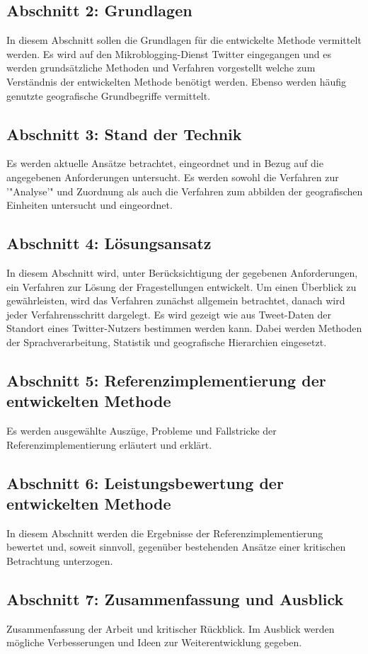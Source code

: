 		\subsection*{Abschnitt 2: Grundlagen}
			In diesem Abschnitt sollen die Grundlagen für die entwickelte Methode vermittelt werden. 
			Es wird auf den Mikroblogging-Dienst Twitter eingegangen und es werden grundsätzliche Methoden und Verfahren vorgestellt welche zum Verständnis der entwickelten Methode benötigt werden. 
			Ebenso werden häufig genutzte geografische Grundbegriffe vermittelt.

		\subsection*{Abschnitt 3: Stand der Technik}
			Es werden aktuelle Ansätze betrachtet, eingeordnet und in Bezug auf die angegebenen Anforderungen untersucht.
			Es werden sowohl die Verfahren zur '"Analyse'" und Zuordnung als auch die Verfahren zum abbilden der geografischen Einheiten untersucht und eingeordnet. 

		\subsection*{Abschnitt 4: Lösungsansatz}
			In diesem Abschnitt wird, unter Berücksichtigung der gegebenen Anforderungen, ein Verfahren zur Lösung der Fragestellungen entwickelt. 
			Um einen Überblick zu gewährleisten, wird das Verfahren zunächst allgemein betrachtet, danach wird jeder Verfahrensschritt dargelegt.
			Es wird gezeigt wie aus Tweet-Daten der Standort eines Twitter-Nutzers bestimmen werden kann.
			Dabei werden Methoden der Sprachverarbeitung, Statistik und geografische Hierarchien eingesetzt. 

		\subsection*{Abschnitt 5: Referenzimplementierung der entwickelten Methode}
			Es werden ausgewählte Auszüge, Probleme und Fallstricke der Referenzimplementierung erläutert und erklärt. 

		\subsection*{Abschnitt 6: Leistungsbewertung der entwickelten Methode}
			In diesem Abschnitt werden die Ergebnisse der Referenzimplementierung bewertet und, soweit sinnvoll, gegenüber bestehenden Ansätze einer kritischen Betrachtung unterzogen. 

		\subsection*{Abschnitt 7: Zusammenfassung und Ausblick}
			Zusammenfassung der Arbeit und kritischer Rückblick. Im Ausblick werden mögliche Verbesserungen und Ideen zur Weiterentwicklung gegeben.  